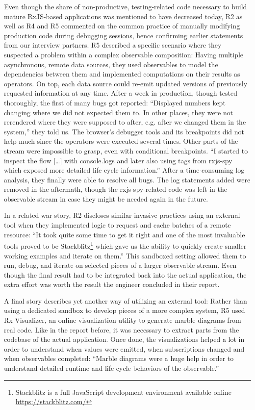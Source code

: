 \documentclass[sigplan,screen,review]{acmart}
\begin{document}
Even though the share of non-productive, testing-related code necessary to build mature RxJS-based applications was mentioned to have decreased today, R2 as well as R4 and R5 commented on the common practice of manually modifying production code during debugging sessions, hence confirming earlier statements from our interview partners. R5 described a specific scenario where they suspected a problem within a complex observable composition: Having multiple asynchronous, remote data sources, they used observables to model the dependencies between them and implemented computations on their results as operators. On top, each data source could re-emit updated versions of previously requested information at any time. After a week in production, though tested thoroughly, the first of many bugs got reported: ``Displayed numbers kept changing where we did not expected them to. In other places, they were not rerendered where they were supposed to after, e.g. after we changed them in the system,'' they told us. The browser's debugger tools and its breakpoints did not help much since the operators were executed several times. Other parts of the stream were impossible to grasp, even with conditional breakpoints. ``I started to inspect the flow [\dots] with console.logs and later also using tags from rxjs-spy which exposed more detailed life cycle information.'' After a time-consuming log analysis, they finally were able to resolve all bugs. The log statements added were removed in the aftermath, though the rxjs-spy-related code was left in the observable stream in case they might be needed again in the future.

In a related war story, R2 discloses similar invasive practices using an external tool when they implemented logic to request and cache batches of a remote resource: ``It took quite some time to get it right and one of the most invaluable tools proved to be Stackblitz\footnote{Stackblitz is a full JavaScript development environment available online \url{https://stackblitz.com/}} which gave us the ability to quickly create smaller working examples and iterate on them.'' This sandboxed setting allowed them to run, debug, and iterate on selected pieces of a larger observable stream. Even though the final result had to be integrated back into the actual application, the extra effort was worth the result the engineer concluded in their report.

A final story describes yet another way of utilizing an external tool: Rather than using a dedicated sandbox to develop pieces of a more complex system, R5 used Rx Visualizer, an online visualization utility to generate marble diagrams from real code. Like in the report before, it was necessary to extract parts from the codebase of the actual application. Once done, the visualizations helped a lot in order to understand when values were emitted, when subscriptions changed and when observables completed: ``Marble diagrams were a huge help in order to understand detailed runtime and life cycle behaviors of the observable.''
\end{document}
